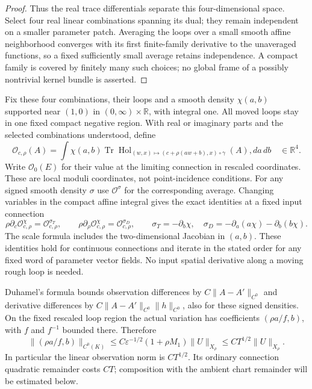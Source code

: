 \documentclass[11pt]{amsart}
\theoremstyle{definition}
\theoremstyle{remark}
\theoremstyle{plain}
\begin{document}
\begin{proof}
Thus the real trace differentials separate this four-dimensional
space. Select four real linear combinations spanning its dual;
they remain independent on a smaller parameter patch. Averaging
the loops over a small smooth affine neighborhood converges with
its first finite-family derivative to the unaveraged functions,
so a fixed sufficiently small average retains independence. A compact
family is covered by finitely many such choices; no global frame
of a possibly nontrivial kernel bundle is asserted.
\end{proof}

Fix these four combinations, their loops and a smooth density
$\chi(a,b)$ supported near $(1,0)$ in $(0,\infty)\times\mathbb R$,
with integral one. All moved loops stay in one fixed compact negative
region. With real or imaginary parts and the selected combinations
understood, define
\begin{equation}\label{eq:gluing-affine-observations}
 \mathcal O_{c,\rho}(A)
   =\int\chi(a,b)\operatorname{Tr}
       \operatorname{Hol}_{(w,x)\mapsto(c+\rho(aw+b),x)\circ\gamma}(A),da\,db
                      \quad\in\mathbb R^4.
\end{equation}
Write $\mathcal O_0(E)$ for their value at the limiting connection
in rescaled coordinates. These are local moduli coordinates, not
point-incidence conditions. For any signed smooth density $\sigma$
use $\mathcal O^\sigma$ for the corresponding average. Changing
variables in the compact affine integral gives the exact identities
at a fixed input connection
\begin{equation}\label{eq:gluing-explicit-observation-derivatives}
 \rho\partial_c\mathcal O^\chi_{c,\rho}
                         =\mathcal O^{\sigma_T}_{c,\rho},\qquad
 \rho\partial_\rho\mathcal O^\chi_{c,\rho}
                         =\mathcal O^{\sigma_D}_{c,\rho},\qquad
 \sigma_T=-\partial_b\chi,\quad
 \sigma_D=-\partial_a(a\chi)-\partial_b(b\chi).
\end{equation}
The scale formula includes the two-dimensional Jacobian in $(a,b)$.
These identities hold for continuous connections and iterate in the
stated order for any fixed word of parameter vector fields. No input
spatial derivative along a moving rough loop is needed.

Duhamel's formula bounds observation differences by
$C\|A-A'\|_{C^0}$ and derivative differences by
$C\|A-A'\|_{C^0}\|h\|_{C^0}$, also for these signed densities.
On the fixed rescaled loop region the actual variation has coefficients
$(\rho a/f,b)$, with $f$ and $f^{-1}$ bounded there. Therefore
\begin{equation}\label{eq:gluing-observation-restriction}
 \|(\rho a/f,b)\|_{C^0(K)}
       \leq C\varepsilon^{-1/2}(1+\rho M_1)\|U\|_{X_\rho}
                                      \leq CT^{1/2}\|U\|_{X_\rho}.
\end{equation}
In particular the linear observation norm is $CT^{1/2}$.
Its ordinary connection quadratic remainder costs $CT$; composition
with the ambient chart remainder will be estimated below.
\end{document}
